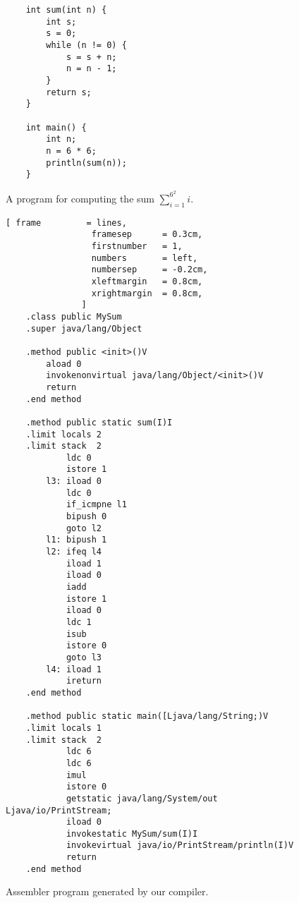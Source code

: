 \begin{figure}[!ht]
\centering
\begin{verbatim}
    int sum(int n) {
        int s;
        s = 0;
        while (n != 0) {
            s = s + n;
            n = n - 1;
        }
        return s;
    }
    
    int main() {
        int n;
        n = 6 * 6;
        println(sum(n));
    }
\end{verbatim}
\vspace*{-0.3cm}
\caption{A  program for computing the sum $\sum\limits_{i=1}^{6^2}i$.}
\label{fig:MySum.c2}
\end{figure}

\begin{figure}[!ht]
\centering
\begin{Verbatim}[ frame         = lines, 
                 framesep      = 0.3cm, 
                 firstnumber   = 1,
                 numbers       = left,
                 numbersep     = -0.2cm,
                 xleftmargin   = 0.8cm,
                 xrightmargin  = 0.8cm,
               ]
    .class public MySum
    .super java/lang/Object
    
    .method public <init>()V
        aload 0
        invokenonvirtual java/lang/Object/<init>()V
        return
    .end method
        
    .method public static sum(I)I
    .limit locals 2
    .limit stack  2
            ldc 0
            istore 1
        l3: iload 0
            ldc 0
            if_icmpne l1
            bipush 0
            goto l2
        l1: bipush 1
        l2: ifeq l4
            iload 1
            iload 0
            iadd
            istore 1
            iload 0
            ldc 1
            isub
            istore 0
            goto l3
        l4: iload 1
            ireturn
    .end method
            
    .method public static main([Ljava/lang/String;)V
    .limit locals 1
    .limit stack  2
            ldc 6
            ldc 6
            imul
            istore 0
            getstatic java/lang/System/out Ljava/io/PrintStream;
            iload 0
            invokestatic MySum/sum(I)I
            invokevirtual java/io/PrintStream/println(I)V
            return
    .end method
\end{Verbatim}
\vspace*{-0.3cm}
\caption{Assembler program generated by our compiler.}
\label{fig:MySum.jas}
\end{figure}

